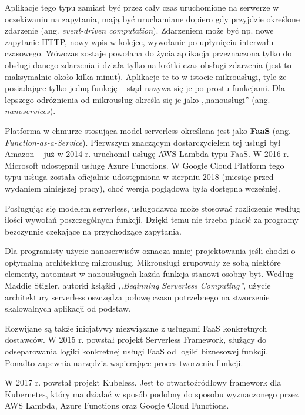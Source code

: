 \documentclass[12pt,a4paper,twoside,titlepage,openright]{book}
\begin{document}
Aplikacje tego typu zamiast być przez cały czas uruchomione na serwerze w oczekiwaniu na zapytania, mają być uruchamiane dopiero gdy przyjdzie określone zdarzenie (ang. \textit{event-driven computation}). Zdarzeniem może być np. nowe zapytanie HTTP, nowy wpis w kolejce, wywołanie po upłynięciu interwału czasowego. Wówczas zostaje powołana do życia aplikacja przeznaczona tylko do obsługi danego zdarzenia i działa tylko na krótki czas obsługi zdarzenia (jest to maksymalnie około kilka minut). Aplikacje te to w istocie mikrousługi, tyle że posiadające tylko jedną funkcję -- stąd nazywa się je po prostu funkcjami. Dla lepszego odróżnienia od mikrousług określa się je jako ,,nanousługi'' (ang. \textit{nanoservices}). \cite{serverlessMaddie, ccResearchSpringer, distributedSystems}

Platforma w chmurze stosująca model serverless określana jest jako \textbf{FaaS} (ang. \textit{Function-as-a-Service}). Pierwszym znaczącym dostarczycielem tej usługi był Amazon -- już w 2014 r. uruchomił usługę AWS Lambda typu FaaS. W 2016 r. Microsoft udostępnił usługę Azure Functions. W Google Cloud Platform tego typu usługa została oficjalnie udostępniona w sierpniu 2018 (miesiąc przed wydaniem niniejszej pracy), choć wersja poglądowa była dostępna wcześniej. 

Posługując się modelem serverless, usługodawca może stosować rozliczenie według ilości wywołań poszczególnych funkcji. Dzięki temu nie trzeba płacić za programy bezczynnie czekające na przychodzące zapytania.

Dla programisty użycie nanoserwisów oznacza mniej projektowania jeśli chodzi o optymalną architekturę mikrousług. Mikrousługi grupowały ze sobą niektóre elementy, natomiast w nanousługach każda funkcja stanowi osobny byt. Według Maddie Stigler, autorki książki \textit{,,Beginning Serverless Computing''}, użycie architektury serverless oszczędza połowę czasu potrzebnego na stworzenie skalowalnych aplikacji od podstaw.\cite{serverlessMaddie}

Rozwijane są także inicjatywy niezwiązane z usługami FaaS konkretnych dostawców. W 2015 r. powstał projekt Serverless Framework,\cite{siteServerlessFramework} służący do odseparowania logiki konkretnej usługi FaaS od logiki biznesowej funkcji. Ponadto zapewnia narzędzia wspierające proces tworzenia funkcji. 

W 2017 r. powstał projekt Kubeless.\cite{siteKubelessReleases} Jest to otwartoźródłowy framework dla Kubernetes, który ma działać w sposób podobny do sposobu wyznaczonego przez AWS Lambda, Azure Functions oraz Google Cloud Functions.\cite{distributedSystems} 
\end{document}
